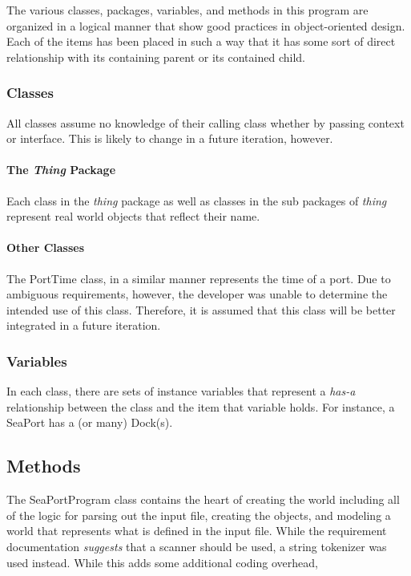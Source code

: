 \documentclass[english,floatsintext,man]{apa6}
\begin{document}
The various classes, packages, variables, and methods in this program
are organized in a logical manner that show good practices in
object-oriented design. Each of the items has been placed in such a way
that it has some sort of direct relationship with its containing parent
or its contained child.

\subsubsection{Classes}\label{classes}

All classes assume no knowledge of their calling class whether by
passing context or interface. This is likely to change in a future
iteration, however.

\paragraph{\texorpdfstring{The \emph{Thing}
Package}{The Thing Package}}\label{the-thing-package}

Each class in the \emph{thing} package as well as classes in the sub
packages of \emph{thing} represent real world objects that reflect their
name.

\paragraph{Other Classes}\label{other-classes}

The PortTime class, in a similar manner represents the time of a port.
Due to ambiguous requirements, however, the developer was unable to
determine the intended use of this class. Therefore, it is assumed that
this class will be better integrated in a future iteration.

\subsubsection{Variables}\label{variables}

In each class, there are sets of instance variables that represent a
\emph{has-a} relationship between the class and the item that variable
holds. For instance, a SeaPort has a (or many) Dock(s).

\subsection{Methods}\label{methods}

The SeaPortProgram class contains the heart of creating the world
including all of the logic for parsing out the input file, creating the
objects, and modeling a world that represents what is defined in the
input file. While the requirement documentation \emph{suggests} that a
scanner should be used, a string tokenizer was used instead. While this
adds some additional coding overhead,
\end{document}

